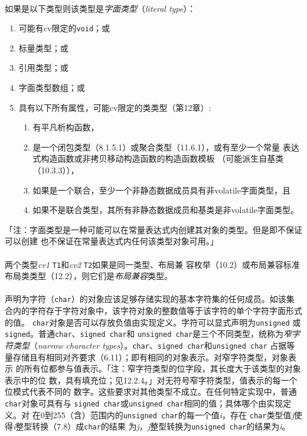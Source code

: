 \paragraph{}
如果是以下类型则该类型是\textit{字面类型}（\textit{literal type}）：
\begin{enumerate}
  \item{可能有cv限定的\texttt{void}；或}
  \item{标量类型；或}
  \item{引用类型；或}
  \item{字面类型数组；或}
  \item{具有以下所有属性，可能cv限定的类类型（第12章）:
      \begin{enumerate}
        \item{有平凡析构函数，}
        \item{是一个闭包类型（8.1.5.1）或聚合类型（11.6.1），或有至少一个常量
          表达式构造函数或非拷贝移动构造函数的构造函数模板
        （可能派生自基类（10.3.3）），}
        \item{如果是一个联合，至少一个非静态数据成员具有非volatile字面类型，且}
        \item{如果不是联合类型，其所有非静态数据成员和基类是非volatile字面类型。}
      \end{enumerate}
    }
\end{enumerate}
「注：字面类型是一种可能可以在常量表达式内创建其对象的类型。但是即不保证可以创建
也不保证在常量表达式内任何该类型对象可用。」

\paragraph{}
两个类型\textit{cv1} \texttt{T1}和\textit{cv2} \texttt{T2}如果是同一类型、布局兼
容枚举（10.2）或布局兼容标准布局类类型（12.2），则它们是\textit{布局兼容}类型。

\paragraph{}
声明为字符（\texttt{char}）的对象应该足够存储实现的基本字符集的任何成员。如该集
合内的字符存于字符对象中，该字符对象的整数值等于该字符的单个字符字面形式的值。
\texttt{char}对象是否可以存放负值由实现定义。字符可以显式声明为\texttt{unsigned}
或\texttt{signed}。普通\texttt{char}、\texttt{signed char}和
\texttt{unsigned char}是三个不同类型，统称为\textit{窄字符类型}（\textit{narrow
character types}）。\texttt{char}、\texttt{signed char}和\texttt{unsigned char}
占据等量存储且有相同对齐要求（6.11）；即有相同的对象表示。对窄字符类型，对象表示
的所有位都参与值表示。「注：窄字符类型的位字段，其长度大于该类型的对象表示中的位
数，具有填充位；见12.2.4。」对无符号窄字符类型，值表示的每一个位模式代表不同的
数字。这些要求对其他类型不成立。在任何特定实现中，普通\texttt{char}对象可具有与
\texttt{signed char}或\texttt{unsigned char}相同的值；具体哪个由实现定义。对
在0到255（含）范围内的\texttt{unsigned char}的每一个值\textit{i}，存在
\texttt{char}类型值\textit{j}使得\textit{i}整型转换（7.8）成\texttt{char}的结果
为\textit{j}，\textit{j}整型转换为\texttt{unsigned char}的结果为\textit{i}。

